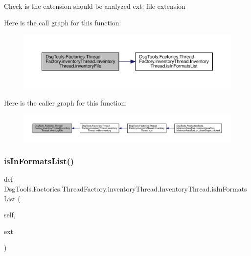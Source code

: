 \begin{DoxyVerb}Check is the extension should be analyzed
ext: file extension
\end{DoxyVerb}
 Here is the call graph for this function\+:
\nopagebreak
\begin{figure}[H]
\begin{center}
\leavevmode
\includegraphics[width=350pt]{class_dsg_tools_1_1_factories_1_1_thread_factory_1_1inventory_thread_1_1_inventory_thread_a63d540736abafb654e777518aeebec6d_cgraph}
\end{center}
\end{figure}
Here is the caller graph for this function\+:
\nopagebreak
\begin{figure}[H]
\begin{center}
\leavevmode
\includegraphics[width=350pt]{class_dsg_tools_1_1_factories_1_1_thread_factory_1_1inventory_thread_1_1_inventory_thread_a63d540736abafb654e777518aeebec6d_icgraph}
\end{center}
\end{figure}
\mbox{\label{class_dsg_tools_1_1_factories_1_1_thread_factory_1_1inventory_thread_1_1_inventory_thread_a2b836f05fa0564687851b4c400121a81}} 
\subsubsection{\texorpdfstring{is\+In\+Formats\+List()}{isInFormatsList()}}
{\footnotesize\ttfamily def Dsg\+Tools.\+Factories.\+Thread\+Factory.\+inventory\+Thread.\+Inventory\+Thread.\+is\+In\+Formats\+List (\begin{DoxyParamCaption}\item[{}]{self,  }\item[{}]{ext }\end{DoxyParamCaption})}


